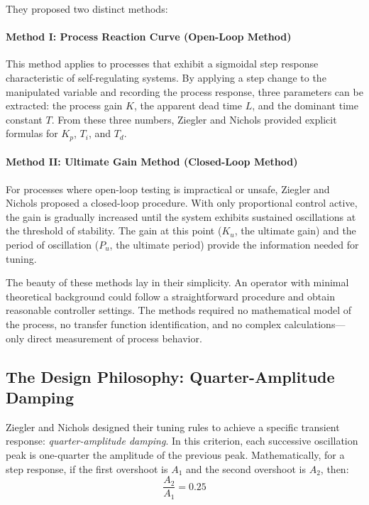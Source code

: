 They proposed two distinct methods:

\paragraph{Method I: Process Reaction Curve (Open-Loop Method)}
This method applies to processes that exhibit a sigmoidal step response characteristic of self-regulating systems. By applying a step change to the manipulated variable and recording the process response, three parameters can be extracted: the process gain $K$, the apparent dead time $L$, and the dominant time constant $T$. From these three numbers, Ziegler and Nichols provided explicit formulas for $K_p$, $T_i$, and $T_d$.

\paragraph{Method II: Ultimate Gain Method (Closed-Loop Method)}
For processes where open-loop testing is impractical or unsafe, Ziegler and Nichols proposed a closed-loop procedure. With only proportional control active, the gain is gradually increased until the system exhibits sustained oscillations at the threshold of stability. The gain at this point ($K_u$, the ultimate gain) and the period of oscillation ($P_u$, the ultimate period) provide the information needed for tuning.

The beauty of these methods lay in their simplicity. An operator with minimal theoretical background could follow a straightforward procedure and obtain reasonable controller settings. The methods required no mathematical model of the process, no transfer function identification, and no complex calculations---only direct measurement of process behavior.

\subsection{The Design Philosophy: Quarter-Amplitude Damping}

Ziegler and Nichols designed their tuning rules to achieve a specific transient response: \textit{quarter-amplitude damping}. In this criterion, each successive oscillation peak is one-quarter the amplitude of the previous peak. Mathematically, for a step response, if the first overshoot is $A_1$ and the second overshoot is $A_2$, then:
\begin{equation}
    \frac{A_2}{A_1} = 0.25
\end{equation}

